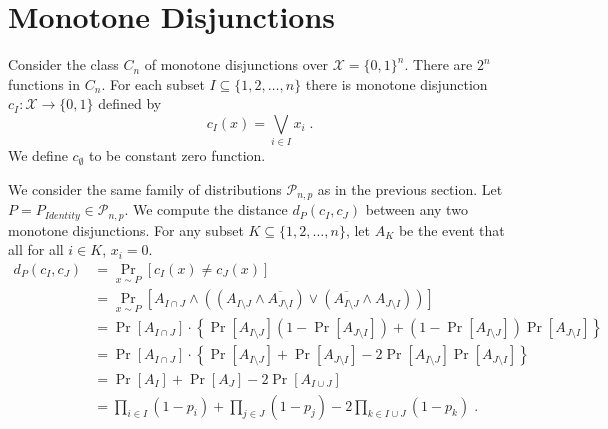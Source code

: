 \documentclass[10pt]{article}
\renewcommand{\P}{\mathcal{P}}
\newcommand{\X}{\mathcal{X}}
\begin{document}
\section{Monotone Disjunctions}

Consider the class $C_n$ of monotone disjunctions over $\X = \{0,1\}^n$. There
are $2^n$ functions in $C_n$. For each subset $I \subseteq \{1,2,\dots,n\}$
there is monotone disjunction $c_I:\X \to \{0,1\}$ defined by
$$
c_I(x) = \bigvee_{i \in I} x_i \; .
$$
We define $c_\emptyset$ to be constant zero function.

We consider the same family of distributions $\P_{n,p}$ as in the previous section.
Let $P = P_{Identity} \in \P_{n,p}$. We compute the distance $d_P(c_I, c_J)$ between
any two monotone disjunctions. For any subset $K \subseteq \{1,2,\dots,n\}$, let
$A_K$ be the event that all for all $i \in K$, $x_i = 0$.
\begin{align*}
d_P(c_I, c_J)
& = \Pr_{x \sim P}[c_I(x) \neq c_J(x)] \\
& = \Pr_{x \sim P}[A_{I \cap J} \wedge ((A_{I \setminus J} \wedge \overline{A_{J \setminus I}}) \vee (\overline{A_{I \setminus J}} \wedge A_{J \setminus I} )) ] \\
& = \Pr[A_{I \cap J}] \cdot \left\{ \Pr[A_{I \setminus J}] (1 - \Pr[A_{J \setminus I}]) + (1 - \Pr[A_{I \setminus J}]) \Pr[A_{J \setminus I}] \right\} \\
& = \Pr[A_{I \cap J}] \cdot \left\{ \Pr[A_{I \setminus J}] + \Pr[A_{J \setminus I}] - 2 \Pr[A_{I \setminus J}] \Pr[A_{J \setminus I}] \right\} \\
& = \Pr[A_I] + \Pr[A_J] - 2 \Pr[A_{I \cup J}] \\
& = \prod_{i \in I} (1 - p_i) + \prod_{j \in J} (1 - p_j) - 2 \prod_{k \in I \cup J} (1 - p_k) \; . \\
\end{align*}



\end{document}
